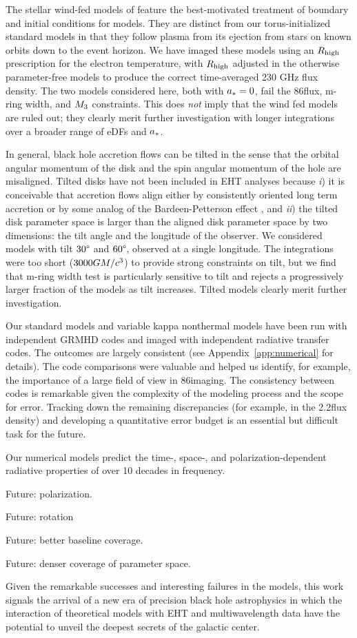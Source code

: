 The stellar wind-fed models of \cite{2020ApJ...896L...6R} feature the best-motivated treatment of boundary and initial conditions for \sgra models.  They are distinct from our torus-initialized standard models in that they follow plasma from its ejection from stars on known orbits down to the event horizon.  We have imaged these models using an $R_\mathrm{high}$ prescription for the electron temperature, with $R_\mathrm{high}$ adjusted in the otherwise parameter-free models to produce the correct time-averaged 230 GHz flux density.  The two models considered here, both with $a_* = 0$, fail the 86\GHz flux, m-ring width, and $M_{3}$ constraints.  This does {\em not} imply that the wind fed models are ruled out; they clearly merit further investigation with longer integrations over a broader range of eDFs and $a_*$.

In general, black hole accretion flows can be tilted in the sense that the orbital angular momentum of the disk and the spin angular momentum of the hole are misaligned.  Tilted disks have not been included in EHT analyses because \emph{i}) it is conceivable that accretion flows align either by consistently oriented long term accretion or by some analog of the Bardeen-Petterson effect \citep{1975ApJ...195L..65B}, and \emph{ii}) the tilted disk parameter space is larger than the aligned disk parameter space by two dimensions: the tilt angle and the longitude of the observer.  We considered models with tilt $30\degree$ and $60\degree$, observed at a single longitude.  The integrations were too short ($3000GM/c^3$) to provide strong constraints on tilt, but we find that m-ring width test is particularly sensitive to tilt and rejects a progressively larger fraction of the models as tilt increases.  Tilted models clearly merit further investigation.

Our standard models and variable kappa nonthermal models have been run with independent GRMHD codes and imaged with independent radiative transfer codes.  The outcomes are largely consistent (see Appendix~\ref{app:numerical} for details).  The code comparisons were valuable and helped us identify, for example, the importance of a large field of view in 86\GHz imaging.  The consistency between codes is remarkable given the complexity of the modeling process and the scope for error.  Tracking down the remaining discrepancies (for example, in the 2.2\um flux density) and developing a quantitative error budget is an essential but difficult task for the future.

Our numerical models predict the time-, space-, and polarization-dependent radiative properties of \sgra over 10 decades in frequency.

Future: polarization.

Future: rotation

Future: better baseline coverage.

Future: denser coverage of parameter space.

Given the remarkable successes and interesting failures in the models, this work signals the arrival of a new era of precision black hole astrophysics in which the interaction of  theoretical models with EHT and multiwavelength data have the potential to unveil the deepest secrets of the galactic center.
